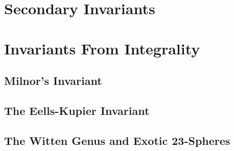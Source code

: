 \section{Secondary Invariants}

\section{Invariants From Integrality}

\subsection{Milnor's Invariant}

\subsection{The Eells-Kupier Invariant}

\subsection{The Witten Genus and Exotic $\mathbf{23}$-Spheres}
